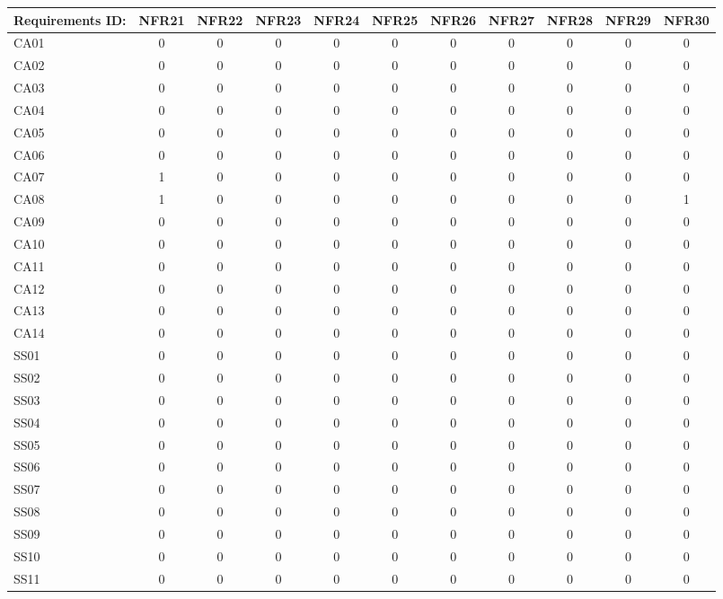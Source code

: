 \documentclass [10pt]{article}
\begin{document}
\begin{longtable}{ | p{} | c | c | c | c | c | c | c | c | c | c | }
\hline
	Requirements ID: & NFR21 & NFR22 & NFR23 & NFR24 & NFR25 & NFR26 & NFR27 & NFR28 & NFR29 & NFR30 \\ \hline
	CA01 & 0 & 0 & 0 & 0 & 0 & 0 & 0 & 0 & 0 & 0 \\ \hline
	CA02 & 0 & 0 & 0 & 0 & 0 & 0 & 0 & 0 & 0 & 0 \\ \hline
	CA03 & 0 & 0 & 0 & 0 & 0 & 0 & 0 & 0 & 0 & 0 \\ \hline
	CA04 & 0 & 0 & 0 & 0 & 0 & 0 & 0 & 0 & 0 & 0 \\ \hline
	CA05 & 0 & 0 & 0 & 0 & 0 & 0 & 0 & 0 & 0 & 0 \\ \hline
	CA06 & 0 & 0 & 0 & 0 & 0 & 0 & 0 & 0 & 0 & 0 \\ \hline
	CA07 & 1 & 0 & 0 & 0 & 0 & 0 & 0 & 0 & 0 & 0 \\ \hline
	CA08 & 1 & 0 & 0 & 0 & 0 & 0 & 0 & 0 & 0 & 1 \\ \hline
	CA09 & 0 & 0 & 0 & 0 & 0 & 0 & 0 & 0 & 0 & 0 \\ \hline
	CA10 & 0 & 0 & 0 & 0 & 0 & 0 & 0 & 0 & 0 & 0 \\ \hline
	CA11 & 0 & 0 & 0 & 0 & 0 & 0 & 0 & 0 & 0 & 0 \\ \hline
	CA12 & 0 & 0 & 0 & 0 & 0 & 0 & 0 & 0 & 0 & 0 \\ \hline
	CA13 & 0 & 0 & 0 & 0 & 0 & 0 & 0 & 0 & 0 & 0 \\ \hline
	CA14 & 0 & 0 & 0 & 0 & 0 & 0 & 0 & 0 & 0 & 0 \\ \hline
	SS01 & 0 & 0 & 0 & 0 & 0 & 0 & 0 & 0 & 0 & 0 \\ \hline
	SS02 & 0 & 0 & 0 & 0 & 0 & 0 & 0 & 0 & 0 & 0 \\ \hline
	SS03 & 0 & 0 & 0 & 0 & 0 & 0 & 0 & 0 & 0 & 0 \\ \hline
	SS04 & 0 & 0 & 0 & 0 & 0 & 0 & 0 & 0 & 0 & 0 \\ \hline
	SS05 & 0 & 0 & 0 & 0 & 0 & 0 & 0 & 0 & 0 & 0 \\ \hline
	SS06 & 0 & 0 & 0 & 0 & 0 & 0 & 0 & 0 & 0 & 0 \\ \hline
	SS07 & 0 & 0 & 0 & 0 & 0 & 0 & 0 & 0 & 0 & 0 \\ \hline
	SS08 & 0 & 0 & 0 & 0 & 0 & 0 & 0 & 0 & 0 & 0 \\ \hline
	SS09 & 0 & 0 & 0 & 0 & 0 & 0 & 0 & 0 & 0 & 0 \\ \hline
	SS10 & 0 & 0 & 0 & 0 & 0 & 0 & 0 & 0 & 0 & 0 \\ \hline
	SS11 & 0 & 0 & 0 & 0 & 0 & 0 & 0 & 0 & 0 & 0 \\ \hline

\end{longtable}
\end{document}
